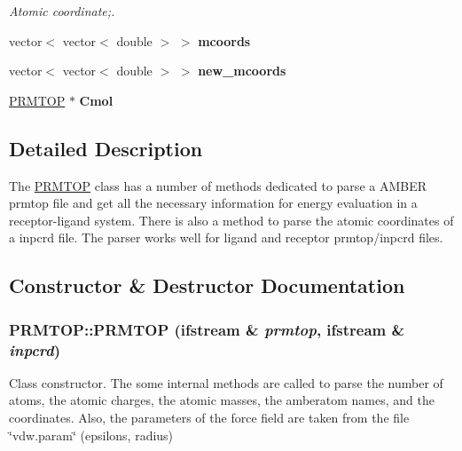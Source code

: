 \begin{DoxyCompactItemize}
\begin{DoxyCompactList}\small\item\em Atomic coordinate;. \item\end{DoxyCompactList}\item 
\hypertarget{classPRMTOP_aeb54222a51e40d6c03db445cba8b6c30}{
vector$<$ vector$<$ double $>$ $>$ {\bfseries mcoords}}
\label{classPRMTOP_aeb54222a51e40d6c03db445cba8b6c30}

\item 
\hypertarget{classPRMTOP_adf5e6fb11cd778d8f1f032d380dc62d7}{
vector$<$ vector$<$ double $>$ $>$ {\bfseries new\_\-mcoords}}
\label{classPRMTOP_adf5e6fb11cd778d8f1f032d380dc62d7}

\item 
\hypertarget{classPRMTOP_aa4913eb379c76b24b1ab5550bec315da}{
\hyperlink{classPRMTOP}{PRMTOP} $\ast$ {\bfseries Cmol}}
\label{classPRMTOP_aa4913eb379c76b24b1ab5550bec315da}

\end{DoxyCompactItemize}


\subsection{Detailed Description}
The \hyperlink{classPRMTOP}{PRMTOP} class has a number of methods dedicated to parse a AMBER prmtop file and get all the necessary information for energy evaluation in a receptor-\/ligand system. There is also a method to parse the atomic coordinates of a inpcrd file. The parser works well for ligand and receptor prmtop/inpcrd files. 

\subsection{Constructor \& Destructor Documentation}
\hypertarget{classPRMTOP_a12f75d42e2d9e9c9d08f53b4159a1674}{
\subsubsection[{PRMTOP}]{\setlength{\rightskip}{0pt plus 5cm}PRMTOP::PRMTOP (ifstream \& {\em prmtop}, \/  ifstream \& {\em inpcrd})}}
\label{classPRMTOP_a12f75d42e2d9e9c9d08f53b4159a1674}
Class constructor. The some internal methods are called to parse the number of atoms, the atomic charges, the atomic masses, the amberatom names, and the coordinates. Also, the parameters of the force field are taken from the file \char`\"{}vdw.param\char`\"{} (epsilons, radius) 

